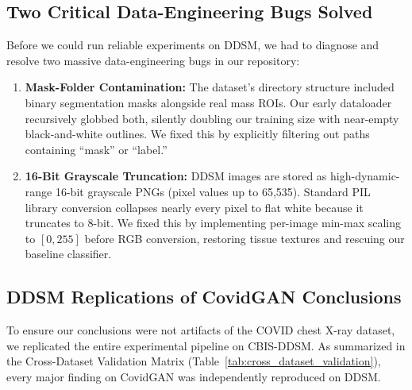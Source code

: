 \documentclass[11pt]{article}
\begin{document}
\subsection{Two Critical Data-Engineering Bugs Solved}
Before we could run reliable experiments on DDSM, we had to diagnose and resolve two massive data-engineering bugs in our repository:
\begin{enumerate}[nosep, leftmargin=1.5em]
  \item \textbf{Mask-Folder Contamination:} The dataset's directory structure included binary segmentation masks alongside real mass ROIs. Our early dataloader recursively globbed both, silently doubling our training size with near-empty black-and-white outlines. We fixed this by explicitly filtering out paths containing ``mask'' or ``label.''
  \item \textbf{16-Bit Grayscale Truncation:} DDSM images are stored as high-dynamic-range 16-bit grayscale PNGs (pixel values up to 65,535). Standard PIL library conversion collapses nearly every pixel to flat white because it truncates to 8-bit. We fixed this by implementing per-image min-max scaling to $[0, 255]$ before RGB conversion, restoring tissue textures and rescuing our baseline classifier.
\end{enumerate}

\subsection{DDSM Replications of CovidGAN Conclusions}
To ensure our conclusions were not artifacts of the COVID chest X-ray dataset, we replicated the entire experimental pipeline on CBIS-DDSM. As summarized in the Cross-Dataset Validation Matrix (Table~\ref{tab:cross_dataset_validation}), every major finding on CovidGAN was independently reproduced on DDSM. 

\begin{table}[htbp]
\centering
\caption{\textbf{Cross-Dataset Validation Matrix.} Mapping the key discoveries and empirical evidence between the primary CovidGAN CXR dataset and the supportive CBIS-DDSM mammography dataset.}
\label{tab:cross_dataset_validation}
\end{table}
\end{document}
